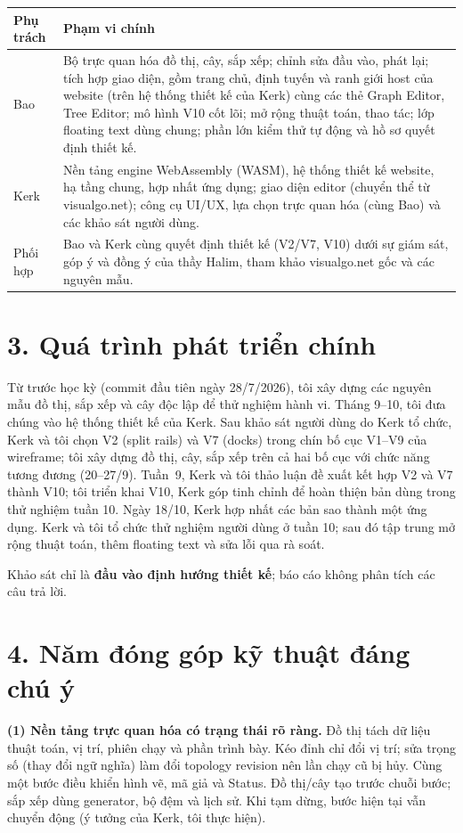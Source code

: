 \documentclass[11pt,a4paper]{article}
\begin{document}
\begin{tabularx}{\linewidth}{@{}p{24mm}Y@{}}\toprule
Phụ trách & Phạm vi chính\\\midrule
Bao & Bộ trực quan hóa đồ thị, cây, sắp xếp; chỉnh sửa đầu vào, phát lại; tích hợp giao diện, gồm trang chủ, định tuyến và ranh giới host của website (trên hệ thống thiết kế của Kerk) cùng các thẻ Graph Editor, Tree Editor; mô hình V10 cốt lõi; mở rộng thuật toán, thao tác; lớp floating text dùng chung; phần lớn kiểm thử tự động và hồ sơ quyết định thiết kế.\\
Kerk & Nền tảng engine WebAssembly (WASM), hệ thống thiết kế website, hạ tầng chung, hợp nhất ứng dụng; giao diện editor (chuyển thể từ visualgo.net); công cụ UI/UX, lựa chọn trực quan hóa (cùng Bao) và các khảo sát người dùng.\\
Phối hợp & Bao và Kerk cùng quyết định thiết kế (V2/V7, V10) dưới sự giám sát, góp ý và đồng ý của thầy Halim, tham khảo visualgo.net gốc và các nguyên mẫu.\\\bottomrule
\end{tabularx}

\section*{3. Quá trình phát triển chính}
Từ trước học kỳ (commit đầu tiên ngày 28/7/2026), tôi xây dựng các nguyên mẫu đồ thị, sắp xếp và cây độc lập để thử nghiệm hành vi. Tháng 9--10, tôi đưa chúng vào hệ thống thiết kế của Kerk. Sau khảo sát người dùng do Kerk tổ chức, Kerk và tôi chọn V2 (split rails) và V7 (docks) trong chín bố cục V1--V9 của wireframe; tôi xây dựng đồ thị, cây, sắp xếp trên cả hai bố cục với chức năng tương đương (20--27/9). Tuần~9, Kerk và tôi thảo luận đề xuất kết hợp V2 và V7 thành V10; tôi triển khai V10, Kerk góp tinh chỉnh để hoàn thiện bản dùng trong thử nghiệm tuần 10. Ngày 18/10, Kerk hợp nhất các bản sao thành một ứng dụng. Kerk và tôi tổ chức thử nghiệm người dùng ở tuần 10; sau đó tập trung mở rộng thuật toán, thêm floating text và sửa lỗi qua rà soát.

Khảo sát chỉ là \textbf{đầu vào định hướng thiết kế}; báo cáo không phân tích các câu trả lời.

\page
\section*{4. Năm đóng góp kỹ thuật đáng chú ý}
\textbf{(1) Nền tảng trực quan hóa có trạng thái rõ ràng.}
Đồ thị tách dữ liệu thuật toán, vị trí, phiên chạy và phần trình bày. Kéo đỉnh chỉ đổi vị trí; sửa trọng số (thay đổi ngữ nghĩa) làm đổi topology revision nên lần chạy cũ bị hủy. Cùng một bước điều khiển hình vẽ, mã giả và Status. Đồ thị/cây tạo trước chuỗi bước; sắp xếp dùng generator, bộ đệm và lịch sử. Khi tạm dừng, bước hiện tại vẫn chuyển động (ý tưởng của Kerk, tôi thực hiện).
\end{document}
